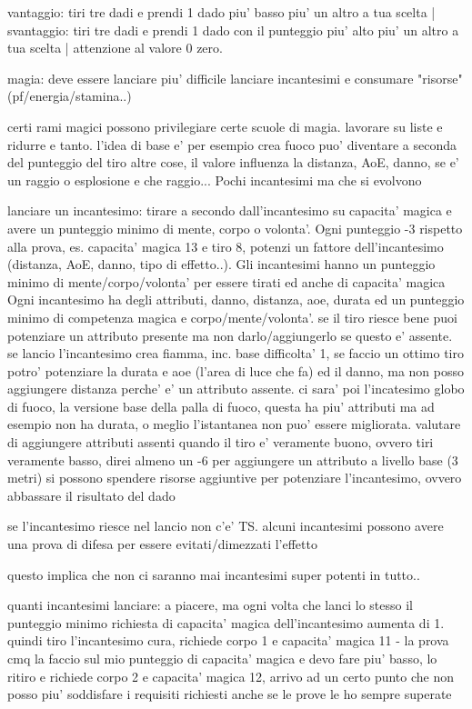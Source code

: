 \documentclass[12pt,a4paper,twoside,openany,twocolumn]{book}
\begin{document}
vantaggio: tiri tre dadi e prendi 1 dado piu' basso piu' un altro a tua scelta   |  svantaggio: tiri tre dadi e prendi 1 dado con il punteggio piu' alto piu' un altro a tua scelta | attenzione al valore 0 zero.

magia: deve essere lanciare piu' difficile lanciare incantesimi e consumare "risorse" (pf/energia/stamina..)

certi rami magici possono privilegiare certe scuole di magia. lavorare su liste e ridurre e tanto. l'idea di base e' per esempio crea fuoco puo' diventare a seconda del punteggio del tiro altre cose, il valore influenza la distanza, AoE, danno, se e' un raggio o esplosione e che raggio...  Pochi incantesimi ma che si evolvono

lanciare un incantesimo: tirare a secondo dall'incantesimo su capacita' magica e avere un punteggio minimo di  mente, corpo o volonta'.  Ogni punteggio -3 rispetto alla prova, es. capacita' magica 13 e tiro 8, potenzi un fattore dell'incantesimo (distanza, AoE, danno, tipo di effetto..). Gli incantesimi hanno un punteggio minimo di mente/corpo/volonta' per essere tirati ed anche di capacita' magica
Ogni incantesimo ha degli attributi, danno, distanza, aoe, durata ed un punteggio minimo di competenza magica e corpo/mente/volonta'. se il tiro riesce bene puoi potenziare un attributo presente ma non darlo/aggiungerlo se questo e' assente. se lancio l'incantesimo crea fiamma, inc. base difficolta' 1, se faccio un ottimo tiro potro' potenziare la durata e aoe (l'area di luce che fa) ed il danno, ma non posso aggiungere distanza perche' e' un attributo assente.
ci sara' poi l'incatesimo globo di fuoco, la versione base della palla di fuoco, questa ha piu' attributi ma ad esempio non ha durata, o meglio l'istantanea non puo' essere migliorata.
valutare di aggiungere attributi assenti quando il tiro e' veramente buono, ovvero tiri veramente basso, direi almeno un -6 per aggiungere un attributo a livello base (3 metri)
si possono spendere risorse aggiuntive per potenziare l'incantesimo, ovvero abbassare il risultato del dado

se l'incantesimo riesce nel lancio non c'e' TS. alcuni incantesimi possono avere una prova di difesa per essere evitati/dimezzati l'effetto

questo implica che non ci saranno mai incantesimi super potenti in tutto..

quanti incantesimi lanciare:  a piacere, ma ogni volta che lanci lo stesso il punteggio minimo richiesta di capacita' magica dell'incantesimo aumenta di 1. quindi tiro l'incantesimo cura, richiede corpo 1 e capacita' magica 11 - la prova cmq la faccio sul mio punteggio di capacita' magica e devo fare piu' basso, lo ritiro e richiede corpo 2 e capacita' magica 12, arrivo ad un certo punto che non posso piu' soddisfare i requisiti richiesti anche se le prove le ho sempre superate
\end{document}
